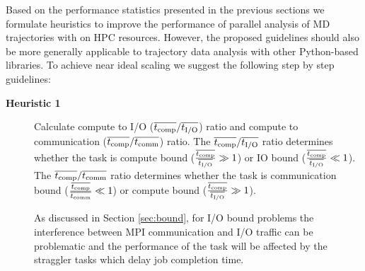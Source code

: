\label{sec:guidelines}

Based on the performance statistics presented in the previous sections we formulate heuristics to improve the performance of parallel analysis of MD trajectories with  on HPC resources.
However, the proposed guidelines should also be more generally applicable to trajectory data analysis with other Python-based libraries.
To achieve near ideal scaling we suggest the following step by step guidelines:

\begin{description}
\item[\textbf{Heuristic 1}] Calculate compute to I/O ($\overline{{t}_{\text{comp}}}/\overline{{t}_{\text{I/O}}}$) ratio and compute to communication ($\overline{{t}_{\text{comp}}}/\overline{t_{\text{comm}}}$) ratio. The $\overline{{t}_{\text{comp}}}/\overline{{t}_{\text{I/O}}}$ ratio determines whether the task is compute bound ($\frac{\overline{{t}_{\text{comp}}}}{\overline{{t}_{\text{I/O}}}} \gg 1$) or IO bound ($\frac{\overline{{t}_{\text{comp}}}}{\overline{{t}_{\text{I/O}}}} \ll 1$).
The $\overline{{t}_{\text{comp}}}/\overline{t_{\text{comm}}}$ ratio determines whether the task is communication bound ($\frac{\overline{{t}_{\text{comp}}}}{\overline{t_{\text{comm}}}} \ll 1$) or compute bound ($\frac{\overline{{t}_{\text{comp}}}}{\overline{{t}_{\text{I/O}}}} \gg 1$).

As discussed in Section \ref{sec:bound}, for I/O bound problems the interference between MPI communication and I/O traffic can be problematic \cite{VMD2013, Kevin2018, Brown:2018ab} and the performance of the task will be affected by the straggler tasks which delay job completion time.
  

\end{description}
